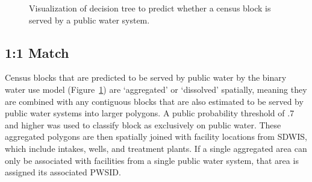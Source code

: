 \documentclass[12pt]{article}
\begin{document}
\begin{figure}


\caption{\label{fig-dt}Visualization of decision tree to predict whether
a census block is served by a public water system.}

\end{figure}%

\subsection{1:1 Match}\label{match}

Census blocks that are predicted to be served by public water by the
binary water use model (Figure~\ref{fig-dt}) are `aggregated' or
`dissolved' spatially, meaning they are combined with any contiguous
blocks that are also estimated to be served by public water systems into
larger polygons. A public probability threshold of .7 and higher was
used to classify block as exclusively on public water. These aggregated
polygons are then spatially joined with facility locations from SDWIS,
which include intakes, wells, and treatment plants. If a single
aggregated area can only be associated with facilities from a single
public water system, that area is assigned its associated PWSID.
\end{document}
